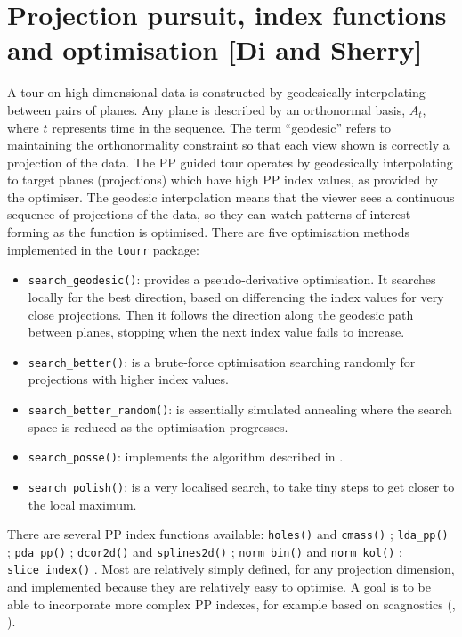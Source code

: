 \documentclass[
  number,
  preprint,
  3p]{elsarticle}
\providecommand{\tightlist}{%
  \setlength{\itemsep}{0pt}\setlength{\parskip}{0pt}}\usepackage{longtable,booktabs,array}
\begin{document}
\section{Projection pursuit, index functions and optimisation {[}Di and
Sherry{]}}\label{sec-background}

A tour on high-dimensional data is constructed by geodesically
interpolating between pairs of planes. Any plane is described by an
orthonormal basis, \(A_t\), where \(t\) represents time in the sequence.
The term ``geodesic'' refers to maintaining the orthonormality
constraint so that each view shown is correctly a projection of the
data. The PP guided tour operates by geodesically interpolating to
target planes (projections) which have high PP index values, as provided
by the optimiser. The geodesic interpolation means that the viewer sees
a continuous sequence of projections of the data, so they can watch
patterns of interest forming as the function is optimised. There are
five optimisation methods implemented in the \texttt{tourr} package:

\begin{itemize}
\tightlist
\item
  \texttt{search\_geodesic()}: provides a pseudo-derivative
  optimisation. It searches locally for the best direction, based on
  differencing the index values for very close projections. Then it
  follows the direction along the geodesic path between planes, stopping
  when the next index value fails to increase.
\item
  \texttt{search\_better()}: is a brute-force optimisation searching
  randomly for projections with higher index values.
\item
  \texttt{search\_better\_random()}: is essentially simulated annealing
  \citep{Bertsimas93} where the search space is reduced as the
  optimisation progresses.
\item
  \texttt{search\_posse()}: implements the algorithm described in
  \citet{posse95}.
\item
  \texttt{search\_polish()}: is a very localised search, to take tiny
  steps to get closer to the local maximum.
\end{itemize}

There are several PP index functions available: \texttt{holes()} and
\texttt{cmass()} \citep{cook1993projection}; \texttt{lda\_pp()}
\citep{lee2005projection}; \texttt{pda\_pp()} \citep{lee2010projection};
\texttt{dcor2d()} and \texttt{splines2d()} \citep{Grimm2016};
\texttt{norm\_bin()} and \texttt{norm\_kol()} \citep{huber85};
\texttt{slice\_index()} \citep{Laa:2020wkm}. Most are relatively simply
defined, for any projection dimension, and implemented because they are
relatively easy to optimise. A goal is to be able to incorporate more
complex PP indexes, for example based on scagnostics (\citet{scag},
\citet{WW08}).
\end{document}

